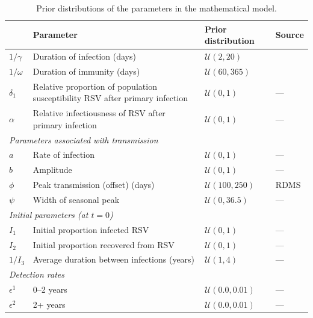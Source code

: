\documentclass[10pt,twoside]{report} %
\begin{document}
\begin{table}[H]
\renewcommand{\arraystretch}{1.5}
\centering\footnotesize
\begin{tabular}{ p{} p{} p{}p{}}%

& \textbf{Parameter} & \textbf{Prior distribution}  & \textbf{Source}\\ \hline
$1/\gamma$ & Duration of infection (days) &  $\mathcal{U}(2,20)$  &  \cite{}\\
$1/\omega$ & Duration of immunity (days) &  $\mathcal{U}(60,365)$  &  \cite{}\\
$\delta_1$ & Relative proportion of population susceptibility RSV after primary infection &  $\mathcal{U}(0,1)$ & ---   \\
$\alpha$ & Relative infectiousness of RSV after primary infection &  $\mathcal{U}(0,1)$ &   ---\\

\multicolumn{3}{l}{\textit{Parameters associated with transmission}}\\

$a$& Rate of infection   & $\mathcal{U}(0, 1)$  & ---\\ 
$b$& Amplitude &  $\mathcal{U}(0, 1)$ & ---\\ 
$\phi$& Peak transmission (offset) (days) &  $\mathcal{U}(100, 250)$ & RDMS\\ 
$\psi$& Width of seasonal peak&  $\mathcal{U}(0, 36.5)$ & ---\\ 

\multicolumn{3}{l}{\textit{Initial parameters (at $t=0$) }}\\

$I_1$ & Initial proportion infected RSV & $\mathcal{U}(0,1)$  &  ---\\ 
$I_2$ & Initial proportion recovered from RSV & $\mathcal{U}(0,1)$  &  ---\\ 
$1/I_3$ & Average duration between infections (years) & $\mathcal{U}(1,4)$  &  ---\\ 

\multicolumn{3}{l}{\textit{Detection rates}}\\

$\epsilon^1$ & 0--2 years  & $\mathcal{U}(0.0, 0.01)$  &  ---\\ 
$\epsilon^2$ & 2+ years  & $\mathcal{U}(0.0, 0.01)$  &  ---\\ 

\hline
\end{tabular}
  \caption{Prior distributions of the parameters in the mathematical model. \label{tab:1}}
\end{table}
\end{document}
